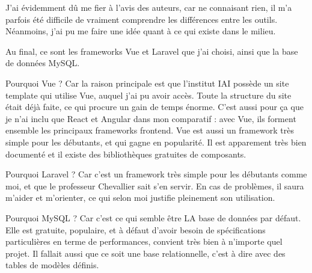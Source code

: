 \documentclass[
    iai, %
    eai, %
]{heig-tb}
\begin{document}
J'ai évidemment dû me fier à l'avis des auteurs, car ne connaisant rien, il m'a parfois été difficile de vraiment comprendre les différences entre les outils.
Néanmoins, j'ai pu me faire une idée quant à ce qui existe dans le milieu.







Au final, ce sont les frameworks Vue et Laravel que j'ai choisi, ainsi que la base de données MySQL.

Pourquoi Vue ? Car la raison principale est que l'institut IAI possède un site template qui utilise Vue, auquel j'ai pu avoir accès.
Toute la structure du site était déjà faite, ce qui procure un gain de temps énorme.
C'est aussi pour ça que je n'ai inclu que React et Angular dans mon comparatif : avec Vue, ils forment ensemble les principaux frameworks frontend.
Vue est aussi un framework très simple pour les débutants, et qui gagne en popularité.
Il est apparement très bien documenté et il existe des bibliothèques gratuites de composants.

Pourquoi Laravel ? Car c'est un framework très simple pour les débutants comme moi, et que le professeur Chevallier sait s'en servir.
En cas de problèmes, il saura m'aider et m'orienter, ce qui selon moi justifie pleinement son utilisation.

Pourquoi MySQL ? Car c'est ce qui semble être LA base de données par défaut. Elle est gratuite, populaire, et à défaut d'avoir besoin de spécifications particulières en terme de performances, convient très bien à n'importe quel projet.
Il fallait aussi que ce soit une base relationnelle, c'est à dire avec des tables de modèles définis.
\end{document}
